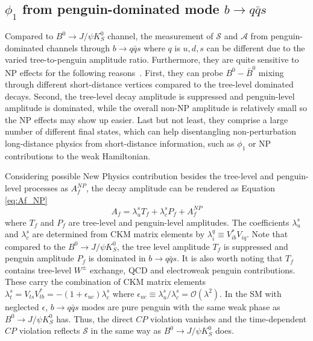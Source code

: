 \subsection{$\phi_1$ from penguin-dominated mode $b\to q\bar{q}s$}
Compared to $B^0 \to J/\psi K^0_S$ channel, the measurement of $\mathcal{S}$ and $\mathcal{A}$ from penguin-dominated channels through $b \to q\bar{q}s$ where $q$ is $u,d,s$ can be different due to the varied tree-to-penguin amplitude ratio. Furthermore, they are quite sensitive to NP effects for the following reasons~\cite{b2book}. First, they can probe $B^0-\bar{B}^0$ mixing through different short-distance vertices compared to the tree-level dominated decays. Second, the tree-level decay amplitude is suppressed and penguin-level amplitude is dominated, while the overall non-NP amplitude is relatively small so the NP effects may show up easier. Last but not least, they comprise a large number of different final states, which can help disentangling non-perturbation long-distance physics from short-distance information, such as $\phi_1$ or NP contributions to the weak Hamiltonian. 

\begin{comment}
First,  the $b\to q\bar{q}s$  gives a different vertex in gluonic decay than tree diagram. 
Second, such process is tree level suppressed but penguin-dominated, so the New Physics effects can be easier to be spotted. The SM agrees with tree level process in percent accuracy so the sub-percent BSM effects may be hard to see. Similar to Fig(1-7), due to FCNC tree level forbidden, 
\begin{figure}[H]
\centering
\texttt{[image: Bto3Ks]}
\caption{penguin mode $b\to q\bar{q}s$ where $\phi$ is formed by two strange quark as the intermediate state.}
\end{figure}

\end{comment}
Considering possible New Physics contribution besides the tree-level and penguin-level processes as $A_f^{NP}$, the decay amplitude can be rendered as Equation \ref{eq:Af_NP} 
\begin{equation}\label{eq:Af_NP}
{A}_f= 
\lambda^s_u T_f + 
\lambda^s_c P_f +
{A}_f^{NP} 
\end{equation}
where $T_f$ and $P_f$ are tree-level and penguin-level amplitudes. The coefficients $\lambda^s_u$ and $\lambda^s_c$  are determined from CKM matrix elements by $\lambda^q_i \equiv V^*_{ib}V_{iq}$. Note that compared to the $B^0 \to J/\psi K^0_S$,
the tree level amplitude $T_f$ is suppressed and penguin amplitude $P_f$ is dominated in $b\to q\bar{q}s$. It is also worth noting that $T_f$ contains tree-level $W^{\pm}$ exchange, QCD and electroweak penguin contributions. These carry the combination of CKM matrix elements $\lambda_t^s = V_{ts}V^*_{tb}=-(1+\epsilon_{uc})\lambda^s_c$ where $\epsilon_{uc} \equiv \lambda^s_u / \lambda^s_c = \mathcal{O}(\lambda^2)$. In the SM with neglected $\epsilon$,  $b\to q\bar{q}s$ modes are pure penguin with the same weak phase as $B^0 \to J/\psi K^0_S$ has. Thus, the direct $CP$ violation vanishes and the time-dependent $CP$ violation reflects $\mathcal{S}$ in the same way as $B^0 \to J/\psi K^0_S$ does. 

